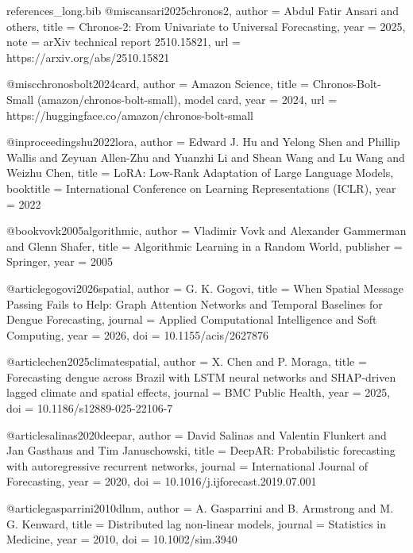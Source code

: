 \begin{filecontents*}[overwrite]{references_long.bib}
@misc{ansari2025chronos2,
  author = {Abdul Fatir Ansari and others},
  title  = {Chronos-2: From Univariate to Universal Forecasting},
  year   = {2025},
  note   = {arXiv technical report 2510.15821},
  url    = {https://arxiv.org/abs/2510.15821}
}

@misc{chronosbolt2024card,
  author = {{Amazon Science}},
  title  = {Chronos-Bolt-Small (amazon/chronos-bolt-small), model card},
  year   = {2024},
  url    = {https://huggingface.co/amazon/chronos-bolt-small}
}

@inproceedings{hu2022lora,
  author    = {Edward J. Hu and Yelong Shen and Phillip Wallis and Zeyuan Allen-Zhu and Yuanzhi Li and Shean Wang and Lu Wang and Weizhu Chen},
  title     = {{LoRA}: Low-Rank Adaptation of Large Language Models},
  booktitle = {International Conference on Learning Representations (ICLR)},
  year      = {2022}
}

@book{vovk2005algorithmic,
  author    = {Vladimir Vovk and Alexander Gammerman and Glenn Shafer},
  title     = {Algorithmic Learning in a Random World},
  publisher = {Springer},
  year      = {2005}
}


@article{gogovi2026spatial,
  author  = {G. K. Gogovi},
  title   = {When Spatial Message Passing Fails to Help: Graph Attention Networks and Temporal Baselines for Dengue Forecasting},
  journal = {Applied Computational Intelligence and Soft Computing},
  year    = {2026},
  doi     = {10.1155/acis/2627876}
}

@article{chen2025climatespatial,
  author  = {X. Chen and P. Moraga},
  title   = {Forecasting dengue across {Brazil} with {LSTM} neural networks and {SHAP}-driven lagged climate and spatial effects},
  journal = {BMC Public Health},
  year    = {2025},
  doi     = {10.1186/s12889-025-22106-7}
}

@article{salinas2020deepar,
  author  = {David Salinas and Valentin Flunkert and Jan Gasthaus and Tim Januschowski},
  title   = {{DeepAR}: Probabilistic forecasting with autoregressive recurrent networks},
  journal = {International Journal of Forecasting},
  year    = {2020},
  doi     = {10.1016/j.ijforecast.2019.07.001}
}

@article{gasparrini2010dlnm,
  author  = {A. Gasparrini and B. Armstrong and M. G. Kenward},
  title   = {Distributed lag non-linear models},
  journal = {Statistics in Medicine},
  year    = {2010},
  doi     = {10.1002/sim.3940}
}


\end{filecontents*}
